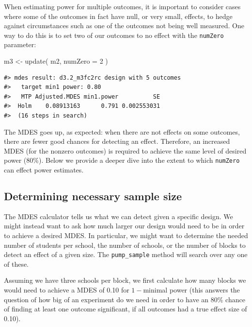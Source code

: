 \documentclass{article}
\newenvironment{Shaded}{\begin{snugshade}}{\end{snugshade}}
\newcommand{\AttributeTok}[1]{\textcolor[rgb]{0.77,0.63,0.00}{#1}}
\newcommand{\DecValTok}[1]{\textcolor[rgb]{0.00,0.00,0.81}{#1}}
\newcommand{\FunctionTok}[1]{\textcolor[rgb]{0.00,0.00,0.00}{#1}}
\newcommand{\NormalTok}[1]{#1}
\newcommand{\OtherTok}[1]{\textcolor[rgb]{0.56,0.35,0.01}{#1}}
\begin{document}
When estimating power for multiple outcomes, it is important to consider
cases where some of the outcomes in fact have null, or very small,
effects, to hedge against circumstances such as one of the outcomes not
being well measured. One way to do this is to set two of our outcomes to
no effect with the \texttt{numZero} parameter:

\begin{Shaded}
\begin{Highlighting}[]
\NormalTok{m3 }\OtherTok{\textless{}{-}} \FunctionTok{update}\NormalTok{( m2, }\AttributeTok{numZero =} \DecValTok{2}\NormalTok{ )}
\end{Highlighting}
\end{Shaded}

\begin{verbatim}
#> mdes result: d3.2_m3fc2rc design with 5 outcomes
#>   target min1 power: 0.80
#>   MTP Adjusted.MDES min1.power          SE
#>  Holm    0.08913163      0.791 0.002553031
#>  (16 steps in search)
\end{verbatim}

The MDES goes up, as expected: when there are not effects on some
outcomes, there are fewer good chances for detecting an effect.
Therefore, an increased MDES (for the nonzero outcomes) is required to
achieve the same level of desired power (80\%). Below we provide a
deeper dive into the extent to which \texttt{numZero} can effect power
estimates.

\subsection{Determining necessary sample size}

The MDES calculator tells us what we can detect given a specific design.
We might instead want to ask how much larger our design would need to be
in order to achieve a desired MDES. In particular, we might want to
determine the needed number of students per school, the number of
schools, or the number of blocks to detect an effect of a given size.
The \texttt{pump\_sample} method will search over any one of these.

Assuming we have three schools per block, we first calculate how many
blocks we would need to achieve a MDES of 0.10 for \(1-\)minimal power
(this answers the question of how big of an experiment do we need in
order to have an 80\% chance of finding at least one outcome
significant, if all outcomes had a true effect size of 0.10).
\end{document}
